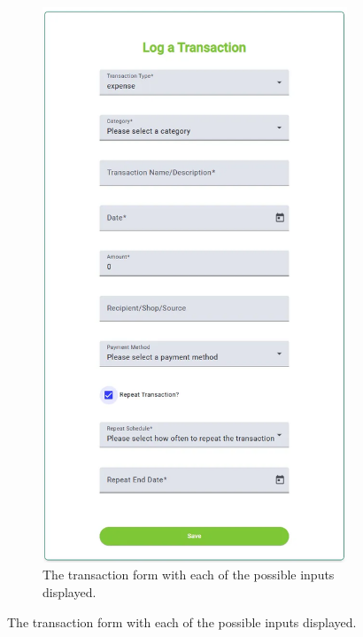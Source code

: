 \documentclass{l4proj}
\begin{document}
\begin{figure}[htb] 
    \centering
    \begin{subfigure}[b]{0.3\textwidth}
        \includegraphics[width=\textwidth]{images/UI-Screenshots/transaction-form.png}
        \caption{The transaction form with each of the possible inputs displayed.}
        \label{fig:transaction-form}
    \end{subfigure}
    \hspace{1em}

\end{figure}
\end{document}

